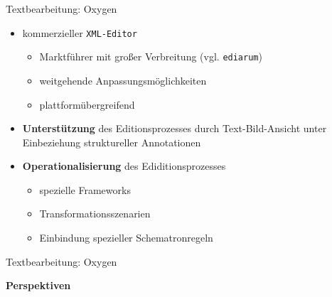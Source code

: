 \documentclass{bbawslides}
\begin{document}
\begin{bbawslide}{Textbearbeitung: Oxygen}
  \vspace*{7mm}%
  \centerslidestrue%
  \begin{itemize}
    \item kommerzieller \texttt{XML-Editor}
    \begin{itemize}
      \item Marktführer mit großer Verbreitung (vgl. \texttt{ediarum})
      \item weitgehende Anpassungsmöglichkeiten
      \item plattformübergreifend    
    \end{itemize}
    \item \textbf{Unterstützung} des Editionsprozesses durch Text-Bild-Ansicht unter Einbeziehung struktureller Annotationen
    \item \textbf{Operationalisierung} des Ediditionsprozesses
    \begin{itemize}
      \item spezielle Frameworks
      \item Transformationsszenarien
      \item Einbindung spezieller Schematronregeln
    \end{itemize}
  \end{itemize}
\end{bbawslide}

\begin{bbawslide}{Textbearbeitung: Oxygen}
  \begin{center}
  \end{center}
\end{bbawslide}

\begin{bbawpart}{\Large\bf Perspektiven}
\end{bbawpart}
\end{document}
